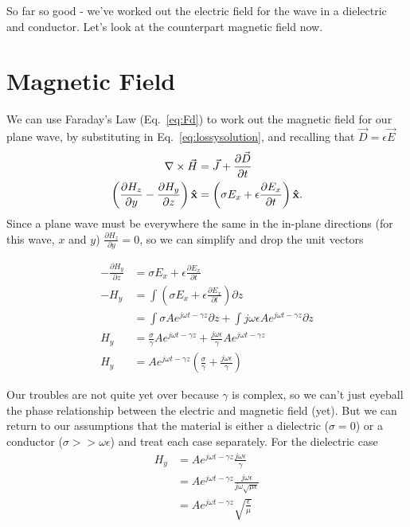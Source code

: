 \documentclass{tufte-handout}
\newcommand{\uvec}[1]{{\bm{\hat{\textnormal{\bfseries #1}}}}}
\begin{document}
So far so good - we've worked out the electric field for the wave in a dielectric and conductor. Let's look at the counterpart magnetic field now. 

\section{Magnetic Field}
 We can use Faraday's Law (Eq.~\ref{eq:Fd}) to work out the magnetic field for our plane wave, by substituting in Eq.~\ref{eq:lossysolution}, and recalling that $\vec{D} = \epsilon\vec{E}$
\begin{align}
\nabla\times\vec{H} &= \vec{J} + \frac{\partial\vec{D}}{\partial t} \\
\left( \frac{\partial H_z}{\partial y} - \frac{\partial H_y}{\partial z} \right) \uvec{x} &=\left( \sigma E_x + \epsilon \frac{\partial E_x}{\partial t}\right)\uvec{x}.
\end{align}
Since a plane wave must be everywhere the same in the in-plane directions (for this wave, $x$ and $y$) $\frac{\partial H_z}{\partial y} = 0$, so we can simplify and drop the unit vectors

\begin{align}
 - \frac{\partial H_y}{\partial z} & = \sigma E_x + \epsilon \frac{\partial E_x}{\partial t} \\
 - H_y & = \int \left(\sigma E_x + \epsilon \frac{\partial E_x}{\partial t}\right) \partial z \\
 &= \int \sigma A e^{j\omega t - \gamma z} \partial z + \int j\omega\epsilon Ae^{j\omega t - \gamma z} \partial z \\
H_y & = \frac{\sigma}{\gamma} A e^{j\omega t - \gamma z} + \frac{j\omega\epsilon}{\gamma} A e^{j\omega t - \gamma z}\\
H_y &= A e^{j\omega t - \gamma z} \left(\frac{\sigma}{\gamma} + \frac{j\omega\epsilon}{\gamma}\right) 
\end{align}

Our troubles are not quite yet over because $\gamma$ is complex, so we can't just eyeball the phase relationship between the electric and magnetic field (yet). But we can return to our assumptions that the material is either a dielectric ($\sigma= 0$) or a conductor ($\sigma >> \omega\epsilon$) and treat each case separately. 
For the dielectric case
\begin{align}
H_y &= A e^{j\omega t - \gamma z} \frac{j\omega\epsilon}{\gamma} \\
 &= A e^{j\omega t - \gamma z} \frac{j\omega\epsilon}{j\omega\sqrt{\mu\epsilon}} \\ 
 &= A e^{j\omega t - \gamma z} \sqrt{\frac{\epsilon}{\mu}} 
\end{align}
\end{document}
